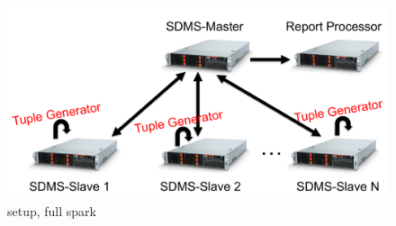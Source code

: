 \begin{figure}[b]
\centering
\includegraphics[width=1\linewidth]{figures/spark-full-diagram.pdf}
\caption{setup, full spark}
\label{fig:sb1-tput}
\end{figure}



